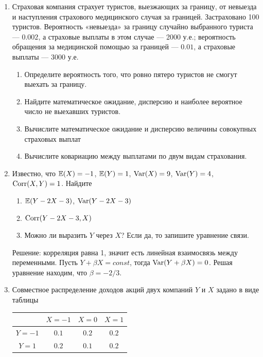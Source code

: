 \documentclass[12pt, a4paper]{article}\usepackage[]{graphicx}\usepackage[]{color}
\begin{document}
\begin{enumerate}
					\item Страховая компания страхует туристов, выезжающих за границу, от невыезда и наступления страхового медицинского случая за границей. Застраховано 100 туристов. Вероятность «невыезда» за границу случайно выбранного туриста — $0.002$, а страховые выплаты в этом случае — 2000 у.е.; вероятность обращения за медицинской помощью за границей — $0.01$, а страховые выплаты — 3000 у.е.
					\begin{enumerate}
						\item Определите вероятность того, что ровно пятеро туристов не смогут выехать за границу.
						\item Найдите математическое ожидание, дисперсию и наиболее вероятное число не выехавших туристов.
						\item Вычислите математическое ожидание и дисперсию величины совокупных страховых выплат
						\item Вычислите ковариацию между выплатами по двум видам страхования.
					\end{enumerate}

					\item Известно, что  $\mathbb{E}(X)=-1$, $\mathbb{E}(Y)=1$, $\operatorname{Var}(X)=9$, $\operatorname{Var}(Y)=4$, $\operatorname{Corr}(X,Y)=1$. Найдите
					\begin{enumerate}
						\item $\mathbb{E}(Y-2X-3)$, $\operatorname{Var}(Y-2X-3)$
						\item  $\operatorname{Corr}(Y-2X-3,X)$
						\item Можно ли выразить $Y$ через $X$? Если да, то запишите уравнение связи.
					\end{enumerate}

					Решение: корреляция равна 1, значит есть линейная взаимосвязь между переменными. Пусть $Y+\beta X=const$, тогда $\operatorname{Var}(Y+\beta X)=0$. Решая уравнение находим, что $\beta=-2/3$.

					\item Совместное распределение доходов акций двух компаний $Y$ и $X$ задано в виде таблицы

					\begin{tabular}{c|ccc}
						& $X=-1$ & $X=0$ & $X=1$ \\
						\hline
						$Y=-1$ & $0.1$ & $0.2$ & $0.2$ \\
						$Y=1$ & $0.2$ & $0.1$ & $0.2$ \\
					\end{tabular}


\end{enumerate}
\end{document}
